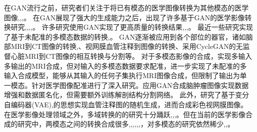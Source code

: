 \documentclass[letterpaper]{article} %
\begin{document}
在GAN流行之前，研究者们关注于将已有模态的医学图像转换为其他模态的医学图像\cite{22burgos2015robust},\cite{33huang2017simultaneous},\cite{34vemulapalli2015unsupervised},\cite{36vannguyen2015crossdomain}。
在GAN展现了强大的生成能力之后，出现了许多基于GAN的医学影像转换研究\cite{2zhang2018translating},\cite{20nie2017medical},\cite{35osokin2017gans},\cite{36vannguyen2015crossdomain},\cite{40kamnitsas2017unsupervised}。
许多研究使用GAN实现了更高质量的转换结果\cite{1zhao2018modular},\cite{5liang2018generative},\cite{6zhu2017unpaired},\cite{13choi2018stargan:}。
最近一些研究实现了基于未配准的多模态数据的转换\cite{2zhang2018translating},\cite{85joyce2017robust}。
GAN逐渐被应用到各个部位的器官，诸如脑部MRI到CT图像的转换\cite{20nie2017medical},\cite{40kamnitsas2017unsupervised}、视网膜血管注释到图像的转换\cite{41costa2017towards}、采用CycleGAN\cite{6zhu2017unpaired}的无监督心脏MRI到CT图像的相互转换与分割\cite{20nie2017medical}等。
对于多模态影像的合成，\cite{84chartsias2018multimodal}实现多输入多输出的MRI合成，但对输入的多模态数据要求配准，\cite{85joyce2017robust}进一步实现了未配准的多输入合成模型，能够从其输入的任何子集执行MRI图像合成，但限制了输出为单一模态。\cite{66miao2018dilated}针对医学图像配准进行了深入研究。\cite{4shin2018medical}应用GAN合成脑肿瘤图像实现数据增强和数据匿名化，但需要额外训练解剖结构分割网络。
此外，\cite{41costa2017towards}研究了基于变分自编码器(VAE)\cite{87kingma2014auto-encoding},\cite{88rezende2014stochastic}的思想实现血管注释图的随机生成，进而合成彩色视网膜图像。
在医学影像处理领域之外，多域转换的的研究十分踊跃\cite{1zhao2018modular},\cite{5liang2018generative},\cite{13choi2018stargan:},\cite{27isola2017image-to-image}。但在当前的医学影像合成的研究中，两模态之间的转换合成很多\cite{2zhang2018translating},\cite{20nie2017medical},\cite{22burgos2015robust},\cite{34vemulapalli2015unsupervised},\cite{35osokin2017gans},\cite{36vannguyen2015crossdomain},\cite{40kamnitsas2017unsupervised}，对多模态的研究依然稀少\cite{84chartsias2018multimodal},\cite{85joyce2017robust},\cite{4shin2018medical}。
\end{document}
